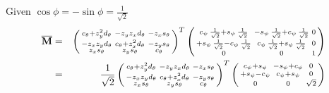 \documentclass{article}
\def\matrix#1{\overline{\bf{#1}}}
\begin{document}
Given $\cos\phi = -\sin\phi = \frac{1}{\sqrt{2}}$
\begin{eqnarray}
	\matrix{M} &=& 
	\begin{pmatrix}
		\begin{smallmatrix}
			c_\theta + z_y^2d_\theta &  -z_yz_xd_\theta & -z_xs_\theta \\
			-z_xz_yd_\theta & c_\theta + z_x^2d_\theta & - z_ys_\theta \\
			z_xs_\theta & z_ys_\theta & c_\theta
		\end{smallmatrix}
	\end{pmatrix}^T
	\begin{pmatrix}
	\begin{smallmatrix}
		c_\psi\,\frac{1}{\sqrt{2}}+s_\psi\,\frac{1}{\sqrt{2}} &  -s_\psi\,\frac{1}{\sqrt{2}} +c_\psi\,\frac{1}{\sqrt{2}} & 0 \\
		+s_\psi\,\frac{1}{\sqrt{2}} -c_\psi\,\frac{1}{\sqrt{2}} & c_\psi\,\frac{1}{\sqrt{2}}+s_\psi\,\frac{1}{\sqrt{2}} & 0 \\
		0 & 0 & 1
	\end{smallmatrix}
	\end{pmatrix}\\
	&=& 
	\frac{1}{\sqrt{2}}\begin{pmatrix}
		\begin{smallmatrix}
			c_\theta + z_y^2d_\theta &  -z_yz_xd_\theta & -z_xs_\theta \\
			-z_xz_yd_\theta & c_\theta + z_x^2d_\theta & - z_ys_\theta \\
			z_xs_\theta & z_ys_\theta & c_\theta
		\end{smallmatrix}
	\end{pmatrix}^T
	\begin{pmatrix}
	\begin{smallmatrix}
		c_\psi+s_\psi &  -s_\psi +c_\psi & 0 \\
		+s_\psi -c_\psi & c_\psi+s_\psi & 0 \\
		0 & 0 & \sqrt{2}
	\end{smallmatrix}
	\end{pmatrix}
\end{eqnarray}
\end{document}
